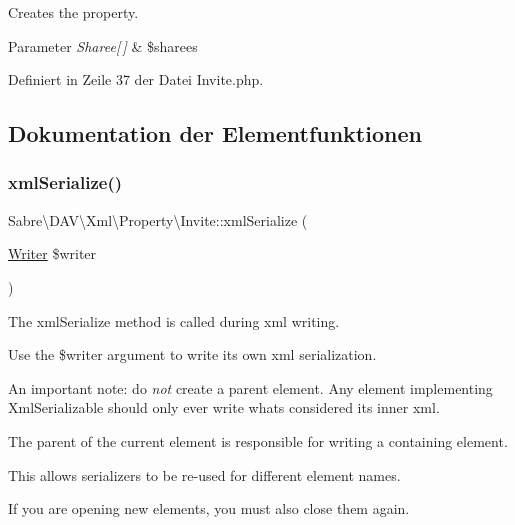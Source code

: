 Creates the property.


\begin{DoxyParams}{Parameter}
{\em Sharee\mbox{[}$\,$\mbox{]}} & \$sharees \\
\hline
\end{DoxyParams}


Definiert in Zeile 37 der Datei Invite.\+php.



\subsection{Dokumentation der Elementfunktionen}
\mbox{\label{class_sabre_1_1_d_a_v_1_1_xml_1_1_property_1_1_invite_a78400777f323c1a2cdc441d003cf6eb9}} 
\subsubsection{\texorpdfstring{xml\+Serialize()}{xmlSerialize()}}
{\footnotesize\ttfamily Sabre\textbackslash{}\+D\+A\+V\textbackslash{}\+Xml\textbackslash{}\+Property\textbackslash{}\+Invite\+::xml\+Serialize (\begin{DoxyParamCaption}\item[{\mbox{\hyperlink{class_sabre_1_1_xml_1_1_writer}{Writer}}}]{\$writer }\end{DoxyParamCaption})}

The xml\+Serialize method is called during xml writing.

Use the \$writer argument to write its own xml serialization.

An important note\+: do {\itshape not} create a parent element. Any element implementing Xml\+Serializable should only ever write what\textquotesingle{}s considered its \textquotesingle{}inner xml\textquotesingle{}.

The parent of the current element is responsible for writing a containing element.

This allows serializers to be re-\/used for different element names.

If you are opening new elements, you must also close them again.


